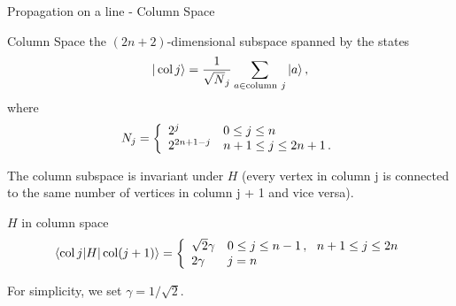 \documentclass{beamer}
\makeatletter
\newcommand{\<}{\langle}
\renewcommand{\>}{\rangle}
\newcommand{\be}{\begin{equation}}
\newcommand{\ee}{\end{equation}}
\newcommand{\cond}[1]{\left\{\begin{array}{l@{~~~}l}#1\end{array}\right.}
\newcommand{\col}{\mathop{\mathrm{col}}\nolimits}
\makeatother
\begin{document}
\begin{frame}[allowframebreaks]{Propagation on a line - Column Space}

\begin{block}{Column Space}
the $(2n+2)$-dimensional subspace spanned by the states
\be
  |\col j\> = {1 \over \sqrt N_j} \sum_{a \in \mathrm{column~} j} |a\>
\,,
\ee
where
\be
  N_j = \cond{2^j        &   0 \le j \le n \\
              2^{2n+1-j} & n+1 \le j \le 2n+1 \,.}
\ee
\end{block}

The column subspace is  invariant under $H$ (every vertex in column j is connected to the same number of vertices in column j + 1 and vice versa).

\framebreak

\begin{block}{$H$ in column space}
\be
  \<\col j|H|\col(j+1)\> = \cond{
   \sqrt 2 \gamma & 0 \le j \le n-1 \,,~~ n+1 \le j \le 2n \\
   2 \gamma       & j=n}
\label{eq:lineham}
\ee
\end{block}
For simplicity, we set $\gamma=1/\sqrt2$. 

\framebreak


\end{frame}
\end{document}
